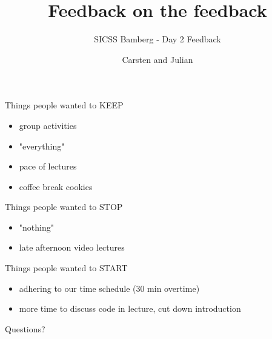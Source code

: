 \documentclass{beamer}
\title{Feedback on the feedback}
\subtitle{SICSS Bamberg - Day 2 Feedback}
\author{Carsten and Julian}
\institute{}
\date{}
\begin{document}
	\maketitle
	
	
	
	
	\begin{frame}
	
	Things people wanted to KEEP
	
	\begin{itemize}
		\item group activities
		\item "everything"
		\item pace of lectures
		\item coffee break cookies
	\end{itemize}
	
\end{frame}

\begin{frame}
Things people wanted to STOP

\begin{itemize}
	\item "nothing"
	\item late afternoon video lectures
\end{itemize}

\end{frame}
\begin{frame}
Things people wanted to START

\begin{itemize}
\item adhering to our time schedule (30 min overtime)
\item more time to discuss code in lecture, cut down introduction
\end{itemize}

\end{frame}


\begin{frame}[standout]

\begin{center}
\LARGE
Questions?
\end{center}

\end{frame}
\end{document}
